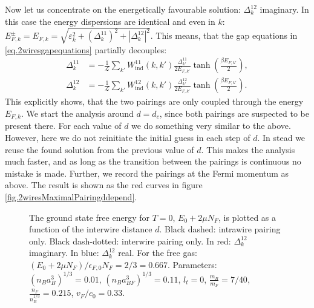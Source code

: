 Now let us concentrate on the energetically favourable solution: $\Delta^{12}_k$ imaginary. In this case the energy dispersions are identical and even in $k$: $E^{\pm}_{F,k} = E_{F,k} = \sqrt{\varepsilon_k^2 + (\Delta^{11}_k)^2 + |\Delta^{12}_k|^2}$. This means, that the gap equations in \eqref{eq.2wiresgapequations} partially decouples: 
\begin{align}
\Delta^{11}_k &= -\frac{1}{\mathcal{L}}\sum_{k'} W_{\text{ind}}^{11}(k, k')\frac{\Delta^{11}_{k'}}{2E_{F,k'}}\tanh\left(\frac{\beta E_{F,k'}}{2}\right), \nonumber \\
\Delta^{12}_k &= -\frac{1}{\mathcal{L}}\sum_{k'} W_{\text{ind}}^{12}(k, k')\frac{\Delta^{12}_{k'}}{2E_{F,k'}}\tanh\left(\frac{\beta E_{F,k'}}{2}\right).
\label{eq.2wiresgapequationsDelta12imaginary}
\end{align} 
This explicitly shows, that the two pairings are only coupled through the energy $E_{F,k}$. We start the analysis around $d = d_c$, since both pairings are suspected to be present there. For each value of $d$ we do something very similar to the above. However, here we do not reinitiate the initial guess in each step of $d$. In stead we reuse the found solution from the previous value of $d$. This makes the analysis much faster, and as long as the transition between the pairings is continuous no mistake is made. Further, we record the pairings at the Fermi momentum as above. The result is shown as the red curves in figure \ref{fig.2wiresMaximalPairingddepend}.

\begin{figure} 
\begin{center}  
  
\caption{The ground state free energy for $T = 0$, $E_0 + 2\mu N_F$, is plotted as a function of the interwire distance $d$. Black dashed: intrawire pairing only. Black dash-dotted: interwire pairing only. In red: $\Delta^{12}_k$ imaginary. In blue: $\Delta^{12}_k$ real. For the free gas: $(E_0 + 2\mu N_F)/\epsilon_{F,0}N_F = 2/3 = 0.667$. Parameters: $(n_Ba_B^3)^{1/3} = 0.01$, $(n_Ba_{BF}^3)^{1/3} = 0.11$, $l_t = 0$, $\frac{m_B}{m_F} = 7/40$, $\frac{n_F}{n_B^{1/3}} = 0.215$, $v_F/c_0 = 0.33$. }  
\label{fig.2wiresE0ddepend}  
\end{center}
\end{figure}

